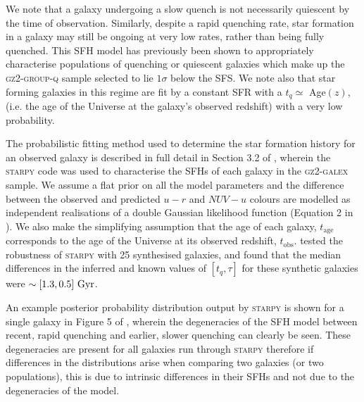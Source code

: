 \documentclass[useAMS,usenatbib]{mn2e}
\def\minor		{\color{minorcol}}
\begin{document}
We note that a galaxy undergoing a slow quench is not necessarily quiescent by the time of observation. Similarly, despite a rapid quenching rate, star formation in a galaxy may still be ongoing at very low rates, rather than being fully quenched. This SFH model has previously been shown to appropriately characterise populations of quenching or quiescent galaxies \citep{Weiner06, Martin07, Noeske07,schawinski14} which make up the \textsc{gz2-group-q} sample selected to lie $1\sigma$ below the SFS. We note also that star forming galaxies in this regime are fit by a constant SFR with a $t_{q} \simeq$ Age$(z)$, (i.e. the age of the Universe at the galaxy's observed redshift) with a very low probability.


The probabilistic fitting method used to determine the star formation history for an observed galaxy is described in full detail in Section 3.2 of \cite{smethurst15}, wherein the \textsc{starpy} code was used to characterise the SFHs of each galaxy in the \textsc{gz2-galex} sample. We assume a flat prior on all the model parameters and the difference between the observed and predicted $u-r$ and $NUV-u$ colours are modelled as independent realisations of a double Gaussian likelihood function (Equation 2 in \citealt{smethurst15}). We also make the simplifying assumption that the age of each galaxy, $t_\mathrm{age}$ corresponds to the age of the Universe at its observed redshift, $t_\mathrm{obs}$. {\minor\cite{smethurst15} tested the robustness of \textsc{starpy} with 25 synthesised galaxies, and found that the median differences in the inferred and known values of $[t_q, \tau]$ for these synthetic galaxies were $\sim[1.3, 0.5]~\rm{Gyr}$.}

An example posterior probability distribution output by \textsc{starpy} is shown for a single galaxy in Figure 5 of \cite{smethurst15}, wherein the degeneracies of the SFH model {\minor between recent, rapid quenching and earlier, slower quenching can clearly be seen}. These degeneracies are present for all galaxies run through \textsc{starpy} therefore if differences in the distributions arise when comparing two galaxies (or two populations), this is due to intrinsic differences in their SFHs and not due to the degeneracies of the model. 
\end{document}

